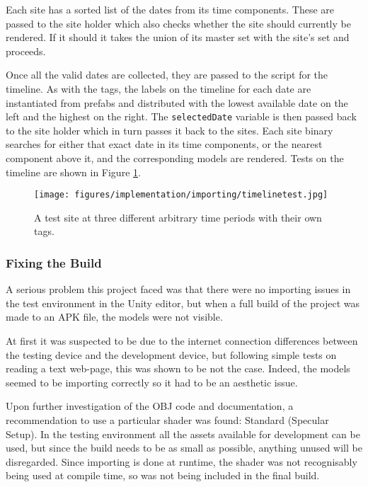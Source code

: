 \documentclass{article}
\begin{document}
Each site has a sorted list of the dates from its time components. These are passed to the site holder which also checks whether the site should currently be rendered. If it should it takes the union of its master set with the site's set and proceeds. 

Once all the valid dates are collected, they are passed to the script for the timeline. As with the tags, the labels on the timeline for each date are instantiated from prefabs and distributed with the lowest available date on the left and the highest on the right. The \verb|selectedDate| variable is then passed back to the site holder which in turn passes it back to the sites. Each site binary searches for either that exact date in its time components, or the nearest component above it, and the corresponding models are rendered. Tests on the timeline are shown in Figure \ref{fig:timelinetest}.

\begin{figure}[h]
    \centering
    \texttt{[image: figures/implementation/importing/timelinetest.jpg]}
        \caption{A test site at three different arbitrary time periods with their own tags.}
        \label{fig:timelinetest}
\end{figure}

\subsubsection{Fixing the Build}
A serious problem this project faced was that there were no importing issues in the test environment in the Unity editor, but when a full build of the project was made to an APK file, the models were not visible. 

At first it was suspected to be due to the internet connection differences between the testing device and the development device, but following simple tests on reading a text web-page, this was shown to be not the case. Indeed, the models seemed to be importing correctly so it had to be an aesthetic issue. 

Upon further investigation of the OBJ code and documentation, a recommendation to use a particular shader was found: Standard (Specular Setup). In the testing environment all the assets available for development can be used, but since the build needs to be as small as possible, anything unused will be disregarded. Since importing is done at runtime, the shader was not recognisably being used at compile time, so was not being included in the final build. 
\end{document}
